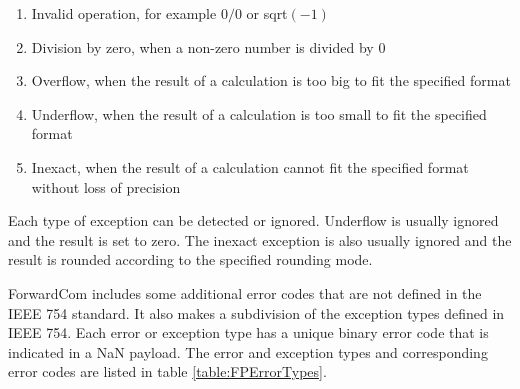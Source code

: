 \documentclass[forwardcom.tex]{subfiles}
\begin{document}
\begin{enumerate}
  \item Invalid operation, for example $0 / 0$ or sqrt$(-1)$
  \item Division by zero, when a non-zero number is divided by 0
  \item Overflow, when the result of a calculation is too big to fit the specified format
  \item Underflow, when the result of a calculation is too small to fit the specified format 
  \item Inexact, when the result of a calculation cannot fit the specified format without loss of precision  
\end{enumerate}

Each type of exception can be detected or ignored. Underflow is usually ignored and the result is set to zero. The inexact exception is also usually ignored and the result is rounded according to the specified rounding mode. 
\vv

ForwardCom includes some additional error codes that are not defined in the IEEE 754 standard. It also makes a subdivision of the exception types defined in IEEE 754. Each error or exception type has a unique binary error code that is indicated in a NaN payload.
The error and exception types and corresponding error codes are listed in table \ref{table:FPErrorTypes}.
\end{document}
